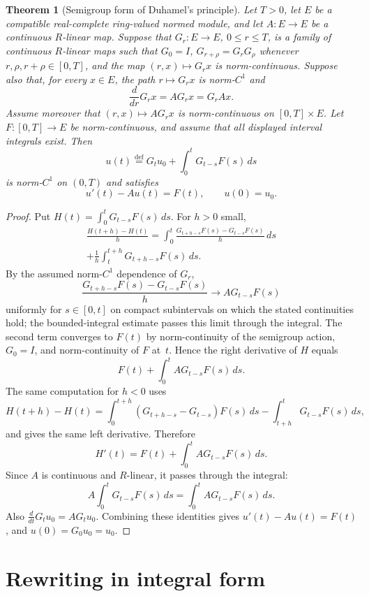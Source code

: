 \documentclass{amsart}
\newtheorem{thm}{Theorem}
\newcommand{\eqdef}{\overset{\mathrm{def}}{=}}
\begin{document}
\begin{thm}[Semigroup form of Duhamel's principle]\label{thm:semigroup-duhamel}
Let $T>0$, let $E$ be a compatible real-complete ring-valued normed module, and
let $A:E\to E$ be a continuous $R$-linear map.  Suppose that
$G_r:E\to E$, $0\leq r\leq T$, is a family of continuous $R$-linear maps such
that $G_0=I$, $G_{r+\rho}=G_rG_\rho$ whenever $r,\rho,r+\rho\in[0,T]$, and
the map $(r,x)\mapsto G_rx$ is norm-continuous.  Suppose also that, for every
$x\in E$, the path $r\mapsto G_rx$ is norm-$C^1$ and
\[
  \frac{d}{dr}G_rx=AG_rx=G_rAx .
\]
Assume moreover that $(r,x)\mapsto AG_rx$ is norm-continuous on
$[0,T]\times E$.
Let $F:[0,T]\to E$ be norm-continuous, and assume that all displayed interval
integrals exist.  Then
\[
  u(t)\eqdef G_tu_0+\int_0^tG_{t-s}F(s)\,ds
\]
is norm-$C^1$ on $(0,T)$ and satisfies
\[
  u'(t)-Au(t)=F(t),\qquad u(0)=u_0 .
\]
\end{thm}

\begin{proof}
Put $H(t)=\int_0^tG_{t-s}F(s)\,ds$.  For $h>0$ small,
\begin{multline*}
  \frac{H(t+h)-H(t)}{h}
  =
  \int_0^t
  \frac{G_{t+h-s}F(s)-G_{t-s}F(s)}{h}\,ds\\
  +\frac1h\int_t^{t+h}G_{t+h-s}F(s)\,ds .
\end{multline*}
By the assumed norm-$C^1$ dependence of $G_r$,
\[
  \frac{G_{t+h-s}F(s)-G_{t-s}F(s)}{h}
  \longrightarrow AG_{t-s}F(s)
\]
uniformly for $s\in[0,t]$ on compact subintervals on which the stated
continuities hold; the bounded-integral estimate passes this limit through the
integral.  The second term converges to $F(t)$ by norm-continuity of the
semigroup action, $G_0=I$, and norm-continuity of $F$ at~$t$.  Hence the
right derivative of $H$ equals
\[
  F(t)+\int_0^tAG_{t-s}F(s)\,ds .
\]
The same computation for $h<0$ uses
\[
H(t+h)-H(t)
=\int_0^{t+h}(G_{t+h-s}-G_{t-s})F(s)\,ds
-\int_{t+h}^tG_{t-s}F(s)\,ds ,
\]
and gives the same left derivative.  Therefore
\[
  H'(t)=F(t)+\int_0^tAG_{t-s}F(s)\,ds .
\]
Since $A$ is continuous and $R$-linear, it passes through the integral:
\[
  A\int_0^tG_{t-s}F(s)\,ds
  =\int_0^tAG_{t-s}F(s)\,ds .
\]
Also $\frac{d}{dt}G_tu_0=AG_tu_0$.  Combining these identities gives
$u'(t)-Au(t)=F(t)$, and $u(0)=G_0u_0=u_0$.
\end{proof}

\section{Rewriting in integral form}
\end{document}
